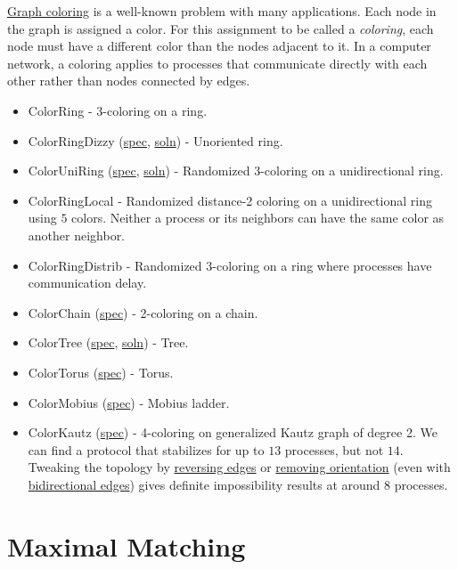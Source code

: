 \href{http://en.wikipedia.org/wiki/Graph_coloring}{Graph coloring} is a well-known problem with many applications.
Each node in the graph is assigned a color.
For this assignment to be called a \textit{coloring}, each node must have a different color than the nodes adjacent to it.
In a computer network, a coloring applies to processes that communicate directly with each other rather than nodes connected by edges.
\begin{itemize}
\item ColorRing \href{Coloring.html#sec:ColorRing}{\LinkText}
- 3-coloring on a ring.
\item ColorRingDizzy (\href{\examplespec/ColorRingDizzy.prot}{spec}, \href{\examplesoln/ColorRingDizzy.prot}{soln})
- Unoriented ring.
\item ColorUniRing (\href{\examplespec/ColorUniRing.prot}{spec}, \href{\examplesoln/ColorUniRing.prot}{soln})
- Randomized 3-coloring on a unidirectional ring.
\item ColorRingLocal \href{Coloring.html#sec:ColorRingLocal}{\LinkText}
- Randomized distance-2 coloring on a unidirectional ring using $5$ colors.
Neither a process or its neighbors can have the same color as another neighbor.
\item ColorRingDistrib \href{Coloring.html#sec:ColorRingDistrib}{\LinkText}
- Randomized 3-coloring on a ring where processes have communication delay.
\item ColorChain (\href{\examplespec/ColorChain.prot}{spec})
- 2-coloring on a chain.
\item ColorTree (\href{\examplespec/ColorTree.prot}{spec}, \href{\examplesoln/ColorTree.prot}{soln})
- Tree.
\item ColorTorus (\href{\examplespec/ColorTorus.prot}{spec})
- Torus.
\item ColorMobius (\href{\examplespec/ColorMobius.prot}{spec})
- Mobius ladder.
\item ColorKautz (\href{\examplespec/ColorKautz.prot}{spec})
- 4-coloring on generalized Kautz graph of degree 2.
We can find a protocol that stabilizes for up to $13$ processes, but not $14$.
Tweaking the topology by
\href{\examplespec/ColorKautzReverse.prot}{reversing edges}
or
\href{\examplespec/ColorKautzDizzy.prot}{removing orientation}
(even with \href{\examplespec/ColorKautzBi.prot}{bidirectional edges})
gives definite impossibility results at around $8$ processes.
\end{itemize}

\section{Maximal Matching}

